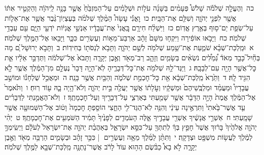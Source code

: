 \documentclass[18pt]{article}
\newcommand{\kri}[1]{\Afootnote{#1}}	%
\begin{document}
 {\loc כה~}וְהֶעֱלָ֣ה שְׁלֹמֹ֡ה שָׁלֹשׁ֩ פְּעָמִ֨ים בַּשָּׁנָ֜ה עֹל֣וֹת וּשְׁלָמִ֗ים עַל־הַמִּזְבֵּ֙חַ֙ אֲשֶׁ֣ר בָּנָ֣ה לַֽיהֹוָ֔ה וְהַקְטֵ֣יר אִתּ֔וֹ אֲשֶׁ֖ר לִפְנֵ֣י יְהֹוָ֑ה וְשִׁלַּ֖ם אֶת־הַבָּֽיִת׃ \startlock
 {\loc כו~}וׇאֳנִ֡י  עָשָׂה֩ הַמֶּ֨לֶךְ שְׁלֹמֹ֜ה בְּעֶצְיֽוֹן־גֶּ֨בֶר אֲשֶׁ֧ר אֶת־אֵל֛וֹת עַל־שְׂפַ֥ת יַם־ס֖וּף בְּאֶ֥רֶץ אֱדֽוֹם׃ \startlock
 {\loc כז~}וַיִּשְׁלַ֨ח חִירָ֤ם  בׇּֽאֳנִי֙  אֶת־עֲבָדָ֔יו אַנְשֵׁ֣י אֳנִיּ֔וֹת יֹדְעֵ֖י הַיָּ֑ם עִ֖ם עַבְדֵ֥י שְׁלֹמֹֽה׃ \startlock
 {\loc כח~}וַיָּבֹ֣אוּ אוֹפִ֔ירָה וַיִּקְח֤וּ מִשָּׁם֙ זָהָ֔ב אַרְבַּע־מֵא֥וֹת וְעֶשְׂרִ֖ים כִּכָּ֑ר וַיָּבִ֖אוּ אֶל־הַמֶּ֥לֶךְ שְׁלֹמֹֽה׃ 
\startlock
 {\loc א~}וּמַֽלְכַּת־שְׁבָ֗א שֹׁמַ֛עַת אֶת־שֵׁ֥מַע שְׁלֹמֹ֖ה לְשֵׁ֣ם יְהֹוָ֑ה וַתָּבֹ֥א לְנַסֹּת֖וֹ בְּחִידֽוֹת׃ \startlock
 {\loc ב~}וַתָּבֹ֣א יְרוּשָׁל ַ֗͏ִם מָה בְּחַ֘יִל֮ כָּבֵ֣ד מְאֹד֒ גְּ֠מַלִּ֠ים נֹשְׂאִ֨ים בְּשָׂמִ֧ים וְזָהָ֛ב רַב־מְאֹ֖ד וְאֶ֣בֶן יְקָרָ֑ה וַתָּבֹא֙ אֶל־שְׁלֹמֹ֔ה וַתְּדַבֵּ֣ר אֵלָ֔יו אֵ֛ת כׇּל־אֲשֶׁ֥ר הָיָ֖ה עִם־לְבָבָֽהּ׃ \startlock
 {\loc ג~}וַיַּגֶּד־לָ֥הּ שְׁלֹמֹ֖ה אֶת־כׇּל־דְּבָרֶ֑יהָ לֹֽא־הָיָ֤ה דָּבָר֙ נֶעְלָ֣ם מִן־הַמֶּ֔לֶךְ אֲשֶׁ֧ר לֹ֦א הִגִּ֖יד לָֽהּ׃ \startlock
 {\loc ד~}וַתֵּ֙רֶא֙ מַֽלְכַּת־שְׁבָ֔א אֵ֖ת כׇּל־חׇכְמַ֣ת שְׁלֹמֹ֑ה וְהַבַּ֖יִת אֲשֶׁ֥ר בָּנָֽה׃ \startlock
 {\loc ה~}וּמַאֲכַ֣ל שֻׁלְחָנ֡וֹ וּמוֹשַׁ֣ב עֲבָדָיו֩ וּמַעֲמַ֨ד  \edtext{מְשָׁרְתָ֜ו}{\kri{קרי: מְשָׁרְתָ֜ו | א-קרי=מְשָׁרְתָ֜יו}}  וּמַלְבֻּֽשֵׁיהֶם֙ וּמַשְׁקָ֔יו וְעֹ֣לָת֔וֹ אֲשֶׁ֥ר יַעֲלֶ֖ה בֵּ֣ית יְהֹוָ֑ה וְלֹא־הָ֥יָה בָ֛הּ ע֖וֹד רֽוּחַ׃ \startlock
 {\loc ו~}וַתֹּ֙אמֶר֙ אֶל־הַמֶּ֔לֶךְ אֱמֶת֙ הָיָ֣ה הַדָּבָ֔ר אֲשֶׁ֥ר שָׁמַ֖עְתִּי בְּאַרְצִ֑י עַל־דְּבָרֶ֖יךָ וְעַל־חׇכְמָתֶֽךָ׃ \startlock
 {\loc ז~}וְלֹא־הֶאֱמַ֣נְתִּי לַדְּבָרִ֗ים עַ֤ד אֲשֶׁר־בָּ֙אתִי֙ וַתִּרְאֶ֣ינָה עֵינַ֔י וְהִנֵּ֥ה לֹֽא־הֻגַּד־לִ֖י הַחֵ֑צִי הוֹסַ֤פְתָּ חׇכְמָה֙ וָט֔וֹב אֶל־הַשְּׁמוּעָ֖ה אֲשֶׁ֥ר שָׁמָֽעְתִּי׃ \startlock
 {\loc ח~}אַשְׁרֵ֣י אֲנָשֶׁ֔יךָ אַשְׁרֵ֖י עֲבָדֶ֣יךָ אֵ֑לֶּה הָעֹמְדִ֤ים לְפָנֶ֙יךָ֙ תָּמִ֔יד הַשֹּׁמְעִ֖ים אֶת־חׇכְמָתֶֽךָ׃ \startlock
 {\loc ט~}יְהִ֨י יְהֹוָ֤ה אֱלֹהֶ֙יךָ֙ בָּר֔וּךְ אֲשֶׁר֙ חָפֵ֣ץ בְּךָ֔ לְתִתְּךָ֖ עַל־כִּסֵּ֣א יִשְׂרָאֵ֑ל בְּאַהֲבַ֨ת יְהֹוָ֤ה אֶת־יִשְׂרָאֵל֙ לְעֹלָ֔ם וַיְשִֽׂימְךָ֣ לְמֶ֔לֶךְ לַעֲשׂ֥וֹת מִשְׁפָּ֖ט וּצְדָקָֽה׃ \startlock
 {\loc י~}וַתִּתֵּ֨ן לַמֶּ֜לֶךְ מֵאָ֥ה וְעֶשְׂרִ֣ים  |  כִּכַּ֣ר זָהָ֗ב וּבְשָׂמִ֛ים הַרְבֵּ֥ה מְאֹ֖ד וְאֶ֣בֶן יְקָרָ֑ה לֹ֣א בָא֩ כַבֹּ֨שֶׂם הַה֥וּא עוֹד֙ לָרֹ֔ב אֲשֶׁר־נָתְנָ֥ה מַֽלְכַּת־שְׁבָ֖א לַמֶּ֥לֶךְ שְׁלֹמֹֽה׃ \startlock
\end{document}
